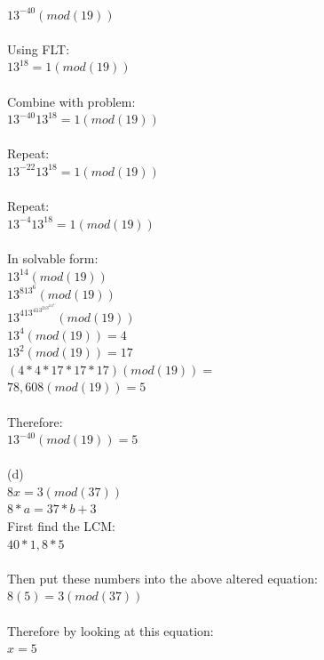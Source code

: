 \documentclass{article}
\begin{document}
\begin{solution}
\\ $13^{-40}(mod (19))$
\\\\ Using FLT:
\\ $13^{18} = 1 (mod (19))$
\\\\ Combine with problem:
\\ $13^{-40}13^{18} = 1(mod (19))$
\\\\ Repeat:
\\ $13^{-22}13^{18} = 1(mod (19))$
\\\\ Repeat:
\\ $13^{-4}13^{18} = 1(mod (19))$
\\\\ In solvable form:
\\ $13^{14}(mod (19))$
\\ $13^813^6(mod (19))$
\\ $13^413^413^213^213^2(mod (19))$
\\ $13^4(mod (19)) = 4$
\\ $13^2(mod (19)) = 17$
\\ $(4*4*17*17*17)(mod (19)) = $
\\ $78,608(mod (19)) = 5$
\\\\ Therefore:
\\ $13^{-40}(mod (19)) = 5$
\newline
\\\\ (d)
\\ $8x = 3(mod (37))$
\\ $8*a = 37*b+3$
\\ First find the LCM:
\\ $40*1, 8*5$
\\\\ Then put these numbers into the above altered equation: 
\\ $8(5) = 3(mod(37))$
\\\\ Therefore by looking at this equation:
\\ $x = 5$

\end{solution}


\vskip 0.1in
\end{document}
